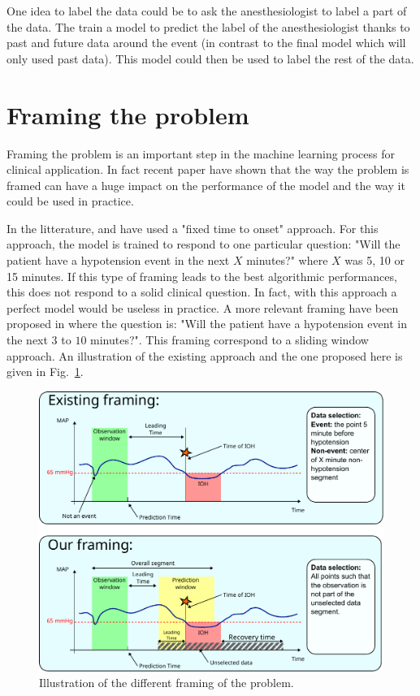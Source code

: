 \documentclass[a4paper,12pt]{article}
\begin{document}
One idea to label the data could be to ask the anesthesiologist to label a part of the data. The train a model to predict the label of the anesthesiologist thanks to past and future data around the event (in contrast to the final model which will only used past data). This model could then be used to label the rest of the data. \medskip


\section{Framing the problem}

Framing the problem is an important step in the machine learning process for clinical application. In fact recent paper \cite{lauritsenFramingMachineLearning2021} have shown that the way the problem is framed can have a huge impact on the performance of the model and the way it could be used in practice. \medskip

In the litterature, \cite{hatibMachinelearningAlgorithmPredict2018} and \cite{leeDeepLearningModels2021} have used a "fixed time to onset" approach. For this approach, the model is trained to respond to one particular question: "Will the patient have a hypotension event in the next $X$ minutes?" where $X$ was 5, 10 or 15 minutes. If this type of framing leads to the best algorithmic performances, this does not respond to a solid clinical question. In fact, with this approach a perfect model would be useless in practice. A more relevant framing have been proposed in \cite{enevoldsenSelectionBiasHypotension2023} where the question is: "Will the patient have a hypotension event in the next $3$ to $10$ minutes?". This framing correspond to a sliding window approach. An illustration of the existing approach and the one proposed here is given in Fig.~\ref{fig:framing}.

\begin{figure}[h]
    \centering
    \includegraphics[width=\textwidth]{figures/framing.pdf}
    \caption{Illustration of the different framing of the problem.}
    \label{fig:framing}
\end{figure}
\end{document}

